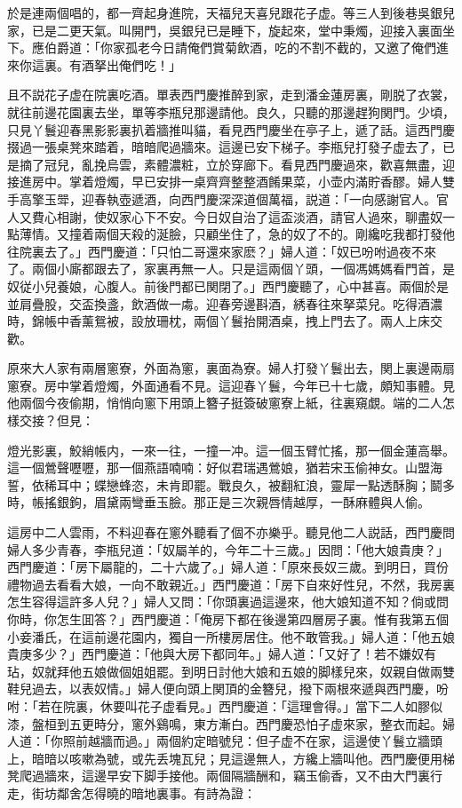 於是連兩個唱的，都一齊起身進院，天福兒天喜兒跟花子虚。等三人到後巷吳銀兒家，已是二更天氣。叫開門，吳銀兒已是睡下，旋起來，堂中秉燭，迎接入裏面坐下。應伯爵道：「你家孤老今日請俺們賞菊飲酒，吃的不割不截的，又邀了俺們進來你這裏。有酒拏出俺們吃！」

且不説花子虚在院裏吃酒。單表西門慶推醉到家，走到潘金蓮房裏，剛脱了衣裳，就往前邊花園裏去坐，單等李瓶兒那邊請他。良久，只聽的那邊趕狗関門。少頃，只見丫鬟迎春黑影影裏扒着牆推叫貓，看見西門慶坐在亭子上，遞了話。這西門慶掇過一張桌凳來踏着，暗暗爬過牆來。這邊已安下梯子。李瓶兒打發子虚去了，已是摘了冠兒，亂挽烏雲，素體濃粧，立於穿廊下。看見西門慶過來，歡喜無盡，迎接進房中。掌着燈燭，早已安排一桌齊齊整整酒餚果菜，小壶内滿貯香醪。婦人雙手高擎玉斝，迎春執壺遞酒，向西門慶深深道個萬福，説道：「一向感謝官人。官人又費心相謝，使奴家心下不安。今日奴自治了這盃淡酒，請官人過來，聊盡奴一點薄情。又撞着兩個天殺的涎臉，只顧坐住了，急的奴了不的。剛纔吃我都打發他往院裏去了。」西門慶道：「只怕二哥還來家麽？」婦人道：「奴已吩咐過夜不來了。兩個小廝都跟去了，家裏再無一人。只是這兩個丫頭，一個馮媽媽看門首，是奴従小兒養娘，心腹人。前後門都已関閉了。」西門慶聽了，心中甚喜。兩個於是並肩疊股，交盃換盞，飲酒做一䖏。迎春旁邊斟酒，綉春往來拏菜兒。吃得酒濃時，錦帳中香薰鴛被，設放珊枕，兩個丫鬟抬開酒桌，拽上門去了。兩人上床交歡。

原來大人家有兩層窻寮，外面為窻，裏面為寮。婦人打發丫鬟出去，関上裏邊兩扇窻寮。房中掌着燈燭，外面通看不見。這迎春丫鬟，今年已十七歲，頗知事體。見他兩個今夜偷期，悄悄向窻下用頭上簪子挺簽破窻寮上紙，往裏窺覷。端的二人怎樣交接？但見：

\begin{myquote}
燈光影裏，鮫綃帳内，一來一往，一撞一冲。這一個玉臂忙搖，那一個金蓮高舉。這一個鶯聲嚦嚦，那一個燕語喃喃：好似君瑞遇鶯娘，猶若宋玉偷神女。山盟海誓，依稀耳中；蝶戀蜂恣，未肯即罷。戰良久，被翻紅浪，靈犀一點透酥胸；鬬多時，帳搖銀鉤，眉黛兩彎垂玉臉。那正是三次親唇情越厚，一酥麻體與人偷。
\end{myquote}

這房中二人雲雨，不料迎春在窻外聽看了個不亦樂乎。聽見他二人説話，西門慶問婦人多少青春，李瓶兒道：「奴屬羊的，今年二十三歲。」因問：「他大娘貴庚？」西門慶道：「房下屬龍的，二十六歲了。」婦人道：「原來長奴三歲。到明日，買份禮物過去看看大娘，一向不敢親近。」西門慶道：「房下自來好性兒，不然，我房裏怎生容得這許多人兒？」婦人又問：「你頭裏過這邊來，他大娘知道不知？倘或問你時，你怎生囬答？」西門慶道：「俺房下都在後邊第四層房子裏。惟有我第五個小妾潘氏，在這前邊花園内，獨自一所樓房居住。他不敢管我。」婦人道：「他五娘貴庚多少？」西門慶道：「他與大房下都同年。」婦人道：「又好了！若不嫌奴有玷，奴就拜他五娘做個姐姐罷。到明日討他大娘和五娘的脚樣兒來，奴親自做兩雙鞋兒過去，以表奴情。」婦人便向頭上関頂的金簪兒，撥下兩根來遞與西門慶，吩咐：「若在院裏，休要叫花子虚看見。」西門慶道：「這理會得。」當下二人如膠似漆，盤桓到五更時分，窻外鷄鳴，東方漸白。西門慶恐怕子虚來家，整衣而起。婦人道：「你照前越牆而過。」兩個約定暗號兒：但子虚不在家，這邊使丫鬟立牆頭上，暗暗以咳嗽為號，或先丢塊瓦兒；見這邊無人，方纔上牆叫他。西門慶便用梯凳爬過牆來，這邊早安下脚手接他。兩個隔牆酬和，竊玉偷香，又不由大門裏行走，街坊鄰舍怎得曉的暗地裏事。有詩為證：

